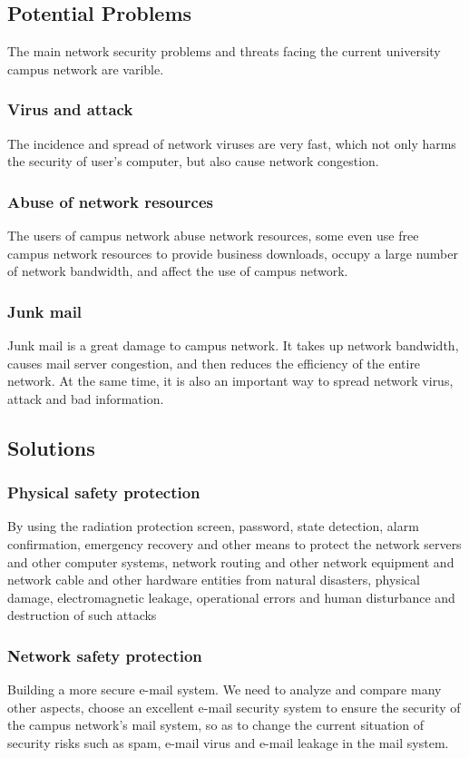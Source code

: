 \documentclass[paper=a4, fontsize=11pt]{scrartcl}
\numberwithin{equation}{section}
\numberwithin{figure}{section}
\numberwithin{table}{section}
\begin{document}
\subsection{Potential Problems}
The main network security problems and threats facing the current university campus network are varible.	
\subsubsection{Virus and attack}
The incidence and spread of network viruses are very fast, which not only harms the security of user's computer, but also cause network congestion. \cite{cn3}
\subsubsection{Abuse of network resources}
The users of campus network abuse network resources, some even use free campus network resources to provide business downloads, occupy a large number of network bandwidth, and affect the use of campus network.
\subsubsection{Junk mail}
Junk mail is a great damage to campus network. It takes up network bandwidth, causes mail server congestion, and then reduces the efficiency of the entire network. At the same time, it is also an important way to spread network virus, attack and bad information. \cite{cn4}
\subsection{Solutions}
\subsubsection{Physical safety protection}
By using the radiation protection screen, password, state detection, alarm confirmation, emergency recovery and other means to protect the network servers and other computer systems, network routing and other network equipment and network cable and other hardware entities from natural disasters, physical damage, electromagnetic leakage, operational errors and human disturbance and destruction of such attacks
\subsubsection{Network safety protection}
Building a more secure e-mail system. We need to analyze and compare many other aspects, choose an excellent e-mail security system to ensure the security of the campus network's mail system, so as to change the current situation of security risks such as spam, e-mail virus and e-mail leakage in the mail system.
\end{document}
